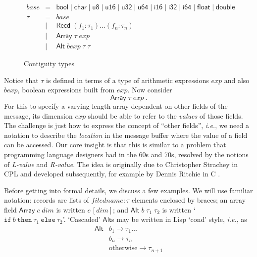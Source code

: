 \documentclass[a4paper,UKenglish,cleveref, autoref, thm-restate]{lipics-v2021}
\newcommand{\ie}{\textit{i.e.}}
\newcommand{\konst}[1]{\ensuremath{\mathsf{#1}}}
\newcommand{\itelse}[3]{\mbox{$\mathtt{if}\ {#1}\ \mathtt{then}\ {#2}\ \mathtt{else}\ {#3}$}}
\begin{document}
\begin{figure}
\[
\begin{array}{rcl}
 \mathit{base} & = & \konst{bool} \mid \konst{char} \mid \konst{u8} \mid
 \konst{u16} \mid \konst{u32} \mid \konst{u64}  \mid \konst{i16} \mid
 \konst{i32} \mid \konst{i64} \mid \konst{float} \mid \konst{double} \\
 \tau & = & \mathit{base} \\
      & \mid & \konst{Recd}\; (f_1 : \tau_1) \ldots (f_n : \tau_n) \\
      & \mid & \konst{Array}\; \tau \; \mathit{exp} \\
      & \mid & \konst{Alt}\; \mathit{bexp}\; \tau \; \tau
\end{array}
\]
\caption{Contiguity types}
\label{contig-types}
\end{figure}

Notice that $\tau$ is defined in terms of a type of arithmetic
expressions $\mathit{exp}$ and also $\mathit{bexp}$, boolean
expressions built from $\mathit{exp}$. Now consider
%
\[
 \konst{Array} \; \tau \; \mathit{exp} \ .
\]
%
For this to specify a varying length array dependent on other fields
of the message, its dimension $\mathit{exp}$ should be able to refer
to the \emph{values} of those fields. The challenge is just how to
express the concept of ``other fields'', \ie, we need a notation to
describe the \emph{location} in the message buffer where the value of
a field can be accessed. Our core insight is that this is similar to a
problem that programming language designers had in the 60s and 70s,
resolved by the notions of \emph{L-value} and \emph{R-value}. The idea
is originally due to Christopher Strachey in CPL \cite{strachey} and
developed subsequently, for example by Dennis Ritchie in
C \cite{dmr-lvals}.

Before getting into formal details, we discuss a few examples.  We
will use familiar notation: records are lists of $\mathit{filedname} :
\tau$ elements enclosed by braces; an array field
$\konst{Array}\;c\;\mathit{dim}$ is written $c\, [\mathit{dim}]$; and
$\konst{Alt}\;b\;\tau_1\;\tau_2$ is written
`$\itelse{b}{\tau_1}{\tau_2}$'. `Cascaded' \konst{Alt}s may be written
in Lisp `cond' style, \ie, as
\[
\begin{array}{ll}
\konst{Alt} & b_1 \longrightarrow \tau_1 \ldots \\
            & b_n \longrightarrow \tau_n \\
            & \text{otherwise} \longrightarrow \tau_{n+1}
\end{array}
\]
\end{document}
